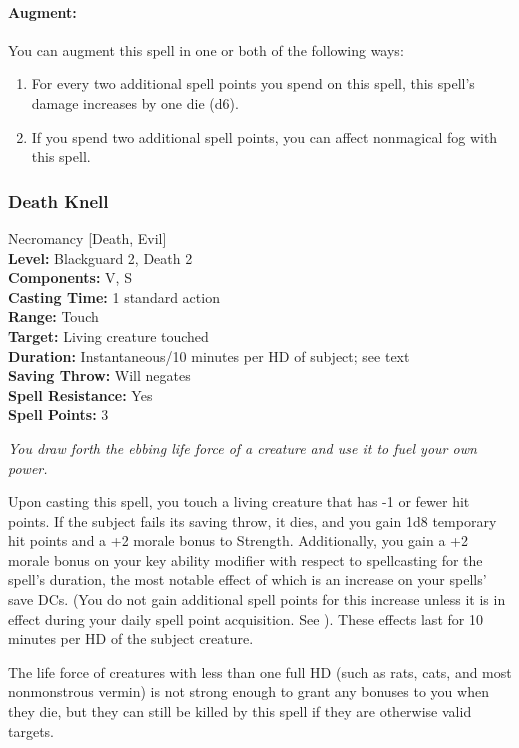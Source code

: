 \paragraph{Augment:} You can augment this spell in one or both of the following ways:
\begin{enumerate}
 \item For every two additional spell points you spend on this spell, this spell's damage increases by one die (d6).
 \item If you spend two additional spell points, you can affect nonmagical fog with this spell.
\end{enumerate}
\subsubsection{Death Knell}
\label{Spell:DeathKnell}
Necromancy [Death, Evil]
\\ \textbf{Level:} Blackguard 2, Death 2
\\ \textbf{Components:} V, S
\\ \textbf{Casting Time:} 1 standard action
\\ \textbf{Range:} Touch
\\ \textbf{Target:} Living creature touched
\\ \textbf{Duration:} Instantaneous/10 minutes per HD of subject; see text
\\ \textbf{Saving Throw:} Will negates
\\ \textbf{Spell Resistance:} Yes
\\ \textbf{Spell Points:} 3

\emph{You draw forth the ebbing life force of a creature and use it to fuel your own power. }

Upon casting this spell, you touch a living creature that has -1 or fewer hit points. 
If the subject fails its saving throw, it dies, and you gain 1d8 temporary hit points and a +2 morale bonus to Strength. 
Additionally, you gain a +2 morale bonus on your key ability modifier with respect to spellcasting for the spell's duration,
the most notable effect of which is an increase on your spells' save DCs.
(You do not gain additional spell points for this increase unless it is in effect during your daily spell point acquisition.
 See ).
These effects last for 10 minutes per HD of the subject creature. 

The life force of creatures with less than one full HD (such as rats, cats, and most nonmonstrous vermin) is not strong enough
to grant any bonuses to you when they die, but they can still be killed by this spell if they are otherwise valid targets.

